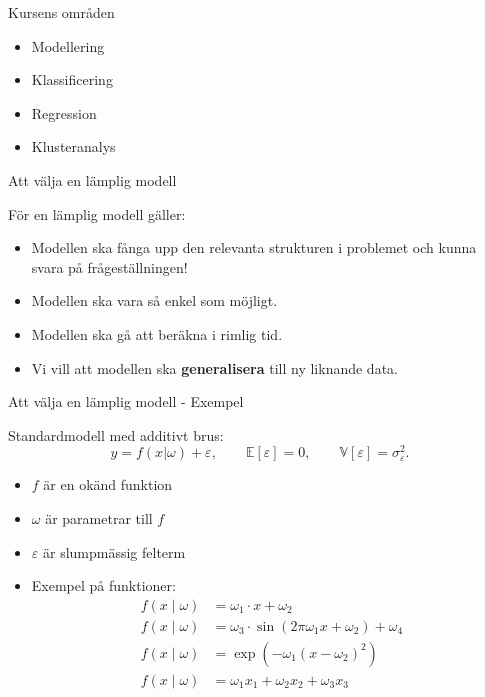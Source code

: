 \documentclass[10pt,english]{beamer}
\begin{document}
\begin{frame}{Kursens områden}
    \begin{itemize}
        \item Modellering
        \item Klassificering
        \item Regression
        \item Klusteranalys
    \end{itemize}
\end{frame}

\begin{frame}{Att välja en lämplig modell}

    För en lämplig modell gäller:
    \begin{itemize}
        \item Modellen ska fånga upp den relevanta strukturen i problemet och kunna svara på frågeställningen!
        \item Modellen ska vara så enkel som möjligt.
        \item Modellen ska gå att beräkna i rimlig tid.
        \item Vi vill att modellen ska \textbf{generalisera} till ny liknande data.
    \end{itemize}

\end{frame}

\begin{frame}{Att välja en lämplig modell - Exempel}
    
    Standardmodell med additivt brus:
    \begin{equation*}
        y = f(x | \omega) + \varepsilon, \qquad \mathbb{E}[\varepsilon] = 0, \qquad \mathbb{V}[\varepsilon] = \sigma^2_{\varepsilon}.
    \end{equation*}

    \begin{itemize}
        \item $f$ är en okänd funktion
        \item $\omega$ är parametrar till $f$
        \item $\varepsilon$ är slumpmässig felterm
        \item Exempel på funktioner:
        \begin{align*}
            f(x \mid \omega) &= \omega_1 \cdot x + \omega_2 \\
            f(x \mid \omega) &= \omega_3 \cdot \sin(2\pi \omega_1 x + \omega_2) + \omega_4 \\
            f(x \mid \omega) &= \exp(- \omega_1 (x - \omega_2)^2) \\
            f(x \mid \omega) &= \omega_1 x_1 + \omega_2 x_2 + \omega_3 x_3 \\
        \end{align*}
    \end{itemize}

\end{frame}
\end{document}
